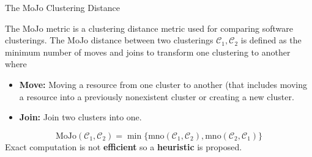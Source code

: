 \documentclass{beamer}
\begin{document}
\begin{frame}{The MoJo Clustering Distance}

The MoJo \cite{mojo} metric is a clustering distance metric used for comparing software clusterings. The MoJo distance between two clusterings $\mathcal C_1, \mathcal C_2$ is defined as the minimum number of moves and joins to transform one clustering to another where 
\begin{itemize}
    \item \textbf{Move:} Moving a resource from one cluster to another (that includes moving a resource into a previously nonexistent cluster or creating a new cluster.
    \item \textbf{Join:} Join two clusters into one.
\end{itemize}

$$\textrm{MoJo} (\mathcal C_1, \mathcal C_2) = \min \{ \textrm{mno} (\mathcal C_1, \mathcal C_2), \textrm{mno}(\mathcal C_2, \mathcal C_1) \}$$
    Exact computation is not \textbf{efficient} so a \textbf{heuristic} is proposed.
\end{frame}
\end{document}
